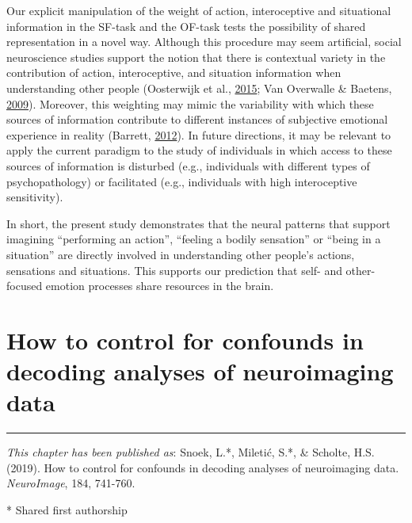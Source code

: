 \documentclass[11pt,american,]{memoir} %
\begin{document}
Our explicit manipulation of the weight of action, interoceptive and situational information in the SF-task and the OF-task tests the possibility of shared representation in a novel way. Although this procedure may seem artificial, social neuroscience studies support the notion that there is contextual variety in the contribution of action, interoceptive, and situation information when understanding other people (Oosterwijk et al., \protect\hyperlink{ref-oosterwijk2015concepts}{2015}; Van Overwalle \& Baetens, \protect\hyperlink{ref-van2009understanding}{2009}). Moreover, this weighting may mimic the variability with which these sources of information contribute to different instances of subjective emotional experience in reality (Barrett, \protect\hyperlink{ref-barrett2012emotions}{2012}). In future directions, it may be relevant to apply the current paradigm to the study of individuals in which access to these sources of information is disturbed (e.g., individuals with different types of psychopathology) or facilitated (e.g., individuals with high interoceptive sensitivity).

In short, the present study demonstrates that the neural patterns that support imagining ``performing an action'', ``feeling a bodily sensation'' or ``being in a situation'' are directly involved in understanding other people's actions, sensations and situations. This supports our prediction that self- and other-focused emotion processes share resources in the brain.

\hypertarget{confounds-decoding}{%
\chapter{How to control for confounds in decoding analyses of neuroimaging data}\label{confounds-decoding}}


\vspace*{\fill}

\begin{center}\rule{0.5\linewidth}{0.5pt}\end{center}

\small

\noindent
\emph{This chapter has been published as}: Snoek, L.*, Miletić, S.*, \& Scholte, H.S. (2019). How to control for confounds in decoding analyses of neuroimaging data. \emph{NeuroImage}, 184, 741-760.

* Shared first authorship
\end{document}
